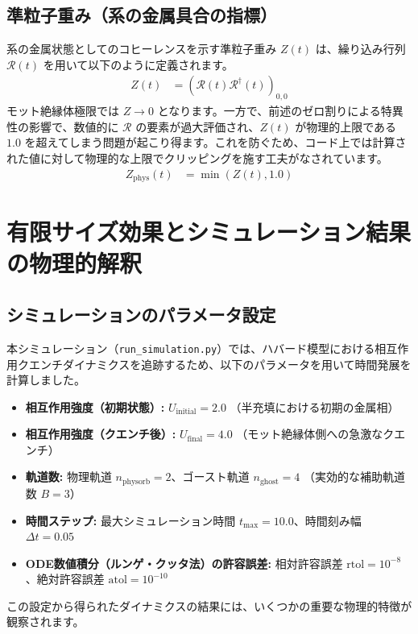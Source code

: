 \documentclass[a4paper,11pt]{ltjarticle}
\begin{document}
\subsection{準粒子重み（系の金属具合の指標）}
系の金属状態としてのコヒーレンスを示す準粒子重み $Z(t)$ は、繰り込み行列 $\mathcal{R}(t)$ を用いて以下のように定義されます。
\begin{align}
    Z(t) &= \left( \mathcal{R}(t)\mathcal{R}^\dagger(t) \right)_{0,0}
\end{align}
モット絶縁体極限では $Z \to 0$ となります。一方で、前述のゼロ割りによる特異性の影響で、数値的に $\mathcal{R}$ の要素が過大評価され、$Z(t)$ が物理的上限である $1.0$ を超えてしまう問題が起こり得ます。これを防ぐため、コード上では計算された値に対して物理的な上限でクリッピングを施す工夫がなされています。
\begin{align}
    Z_{\text{phys}}(t) &= \min\left( Z(t), 1.0 \right)
\end{align}

\section{有限サイズ効果とシミュレーション結果の物理的解釈}

\subsection{シミュレーションのパラメータ設定}
本シミュレーション（\texttt{run\_simulation.py}）では、ハバード模型における相互作用クエンチダイナミクスを追跡するため、以下のパラメータを用いて時間発展を計算しました。
\begin{itemize}
    \item \textbf{相互作用強度（初期状態）:} $U_{\text{initial}} = 2.0$ （半充填における初期の金属相）
    \item \textbf{相互作用強度（クエンチ後）:} $U_{\text{final}} = 4.0$ （モット絶縁体側への急激なクエンチ）
    \item \textbf{軌道数:} 物理軌道 $n_{\text{physorb}} = 2$、ゴースト軌道 $n_{\text{ghost}} = 4$ （実効的な補助軌道数 $B = 3$）
    \item \textbf{時間ステップ:} 最大シミュレーション時間 $t_{\text{max}} = 10.0$、時間刻み幅 $\Delta t = 0.05$
    \item \textbf{ODE数値積分（ルンゲ・クッタ法）の許容誤差:} 相対許容誤差 $\text{rtol} = 10^{-8}$、絶対許容誤差 $\text{atol} = 10^{-10}$
\end{itemize}
この設定から得られたダイナミクスの結果には、いくつかの重要な物理的特徴が観察されます。
\end{document}
